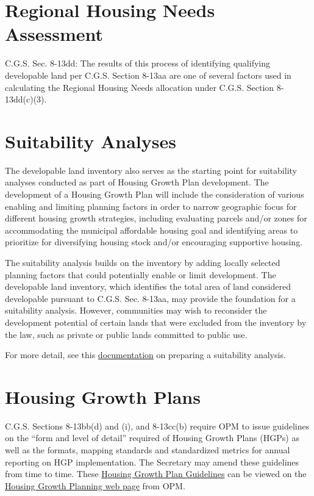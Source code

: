 \documentclass[
  letterpaper,
  DIV=11,
  numbers=noendperiod]{scrreprt}
\begin{document}
\section{Regional Housing Needs
Assessment}\label{regional-housing-needs-assessment}

C.G.S. Sec. 8-13dd: The results of this process of identifying
qualifying developable land per C.G.S. Section 8-13aa are one of several
factors used in calculating the Regional Housing Needs allocation under
C.G.S. Section 8-13dd(c)(3).

\section{Suitability Analyses}\label{suitability-analyses}

The developable land inventory also serves as the starting point for
suitability analyses conducted as part of Housing Growth Plan
development. The development of a Housing Growth Plan will include the
consideration of various enabling and limiting planning factors in order
to narrow geographic focus for different housing growth strategies,
including evaluating parcels and/or zones for accommodating the
municipal affordable housing goal and identifying areas to prioritize
for diversifying housing stock and/or encouraging supportive housing.

The suitability analysis builds on the inventory by adding locally
selected planning factors that could potentially enable or limit
development. The developable land inventory, which identifies the total
area of land considered developable pursuant to C.G.S. Sec. 8-13aa, may
provide the foundation for a suitability analysis. However, communities
may wish to reconsider the development potential of certain lands that
were excluded from the inventory by the law, such as private or public
lands committed to public use.

For more detail, see this
\href{https://housingmaps.ct.gov/pages/suitability-analysis}{documentation}
on preparing a suitability analysis.

\section{Housing Growth Plans}\label{housing-growth-plans}

C.G.S. Sections 8-13bb(d) and (i), and 8-13cc(b) require OPM to issue
guidelines on the ``form and level of detail'' required of Housing
Growth Plans (HGPs) as well as the formats, mapping standards and
standardized metrics for annual reporting on HGP implementation. The
Secretary may amend these guidelines from time to time. These
\href{https://experience.arcgis.com/experience/057c27cda2d848edbcb1ffac4a1b8898/page/Housing-Growth-Plans-Page}{Housing
Growth Plan Guidelines} can be viewed on the
\href{https://experience.arcgis.com/experience/057c27cda2d848edbcb1ffac4a1b8898/page/Homepage}{Housing
Growth Planning web page} from OPM.
\end{document}
